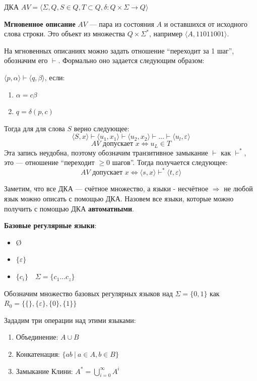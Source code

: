 \begin{definition}
    ДКА $AV=\langle \Sigma, Q, S\in Q, T\subset Q, \delta:Q\times\Sigma\to Q\rangle$

    \textbf{Мгновенное описание} $AV$ --- пара из состояния $A$ и оставшихся от исходного слова строки. Это объект из множества $Q\times \Sigma^*$, например $\langle A, 11011001\rangle$.

    На мгновенных описаниях можно задать отношение ``переходит за 1 шаг'', обозначим его $\vdash$. Формально оно задается следующим образом:

    $\langle p, \alpha\rangle\vdash \langle q, \beta\rangle$, если:
    \begin{enumerate}
        \item $\alpha=c\beta$
        \item $q=\delta(p, c)$
    \end{enumerate}

    Тогда для для слова $S$ верно следующее:
    $$\langle S, x\rangle\vdash \langle u_1, x_1\rangle\vdash\langle u_2, x_2\rangle\vdash\ldots\vdash \langle u_l, \varepsilon\rangle$$
    $$AV \text{ допускает } x \Leftrightarrow u_L\in T$$
    Эта запись неудобна, поэтому обозначим транзитивное замыкание $\vdash$ как $\vdash^*$, это --- отношение ``переходит $\geq 0$ шагов''. Тогда получается следующее:
    $$AV \text{ допускает } x \Leftrightarrow \langle s, x\rangle\vdash^*\langle t, \varepsilon\rangle$$
\end{definition}

Заметим, что все ДКА --- счётное множество, а языки - несчётное $\Rightarrow$ не любой язык можно описать с помощью ДКА. Назовем все языки, которые можно получить с помощью ДКА \textbf{автоматными}.

\begin{definition}
    \textbf{Базовые регулярные языки}:
    \begin{itemize}
        \item \O
        \item $\{\varepsilon\}$
        \item $\{c_i\} \quad \Sigma=\{c_1\ldots c_z\}$
    \end{itemize}
\end{definition}

Обозначим множество базовых регулярных языков над $\Sigma=\{0, 1\}$ как $R_0=\{\{\}, \{\varepsilon\}, \{0\}, \{1\}\}$

Зададим три операции над этими языками:
\begin{enumerate}
    \item Объединение: $A\cup B$
    \item Конкатенация: $\{ab\ |\ a\in A, b\in B\}$
    \item Замыкание Клини: $A^*=\bigcup\limits_{i=0}^\infty A^i$
\end{enumerate}

